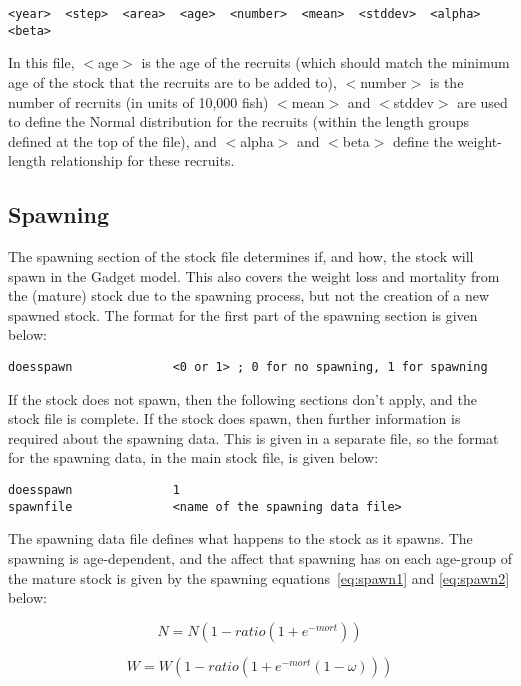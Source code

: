 \documentclass [a4paper, 10pt]{book}
\begin{document}
\begin{verbatim}
<year>  <step>  <area>  <age>  <number>  <mean>  <stddev>  <alpha>  <beta>
\end{verbatim}

In this file, $<$age$>$ is the age of the recruits (which should match the minimum age of the stock that the recruits are to be added to), $<$number$>$ is the number of recruits (in units of 10,000 fish) $<$mean$>$ and $<$stddev$>$ are used to define the Normal distribution for the recruits (within the length groups defined at the top of the file), and $<$alpha$>$ and $<$beta$>$ define the weight-length relationship for these recruits.

\subsection{Spawning}\label{subsec:stockspawn}
The spawning section of the stock file determines if, and how, the stock will spawn in the Gadget model.   This also covers the weight loss and mortality from the (mature) stock due to the spawning process, but not the creation of a new spawned stock.  The format for the first part of the spawning section is given below:

\begin{verbatim}
doesspawn              <0 or 1> ; 0 for no spawning, 1 for spawning
\end{verbatim}

If the stock does not spawn, then the following sections don't apply, and the stock file is complete.  If the stock does spawn, then further information is required about the spawning data.  This is given in a separate file, so the format for the spawning data, in the main stock file, is given below:

\begin{verbatim}
doesspawn              1
spawnfile              <name of the spawning data file>
\end{verbatim}

The spawning data file defines what happens to the stock as it spawns.  The spawning is age-dependent, and the affect that spawning has on each age-group of the mature stock is given by the spawning equations~\ref{eq:spawn1} and \ref{eq:spawn2} below:

\begin{equation}\label{eq:spawn1}
N = N {\left(1 - ratio {( 1 + e^{-mort})}\right)}
\end{equation}

\begin{equation}\label{eq:spawn2}
W = W {\left(1 - ratio {\left( 1 + e^{-mort}(1 - \omega)\right)}\right)}
\end{equation}
\end{document}
